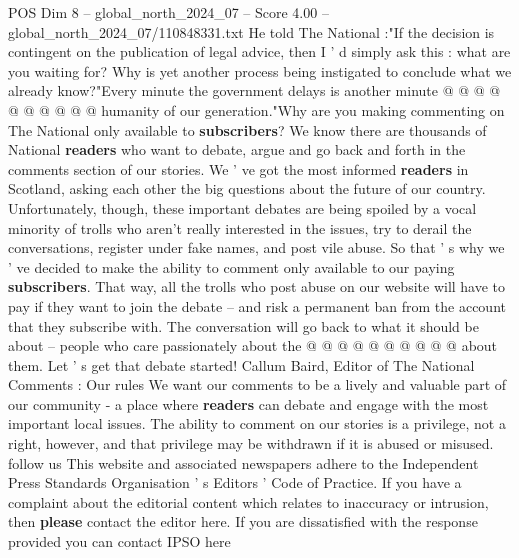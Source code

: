 \begin{textsample}{POS Dim 8 – global\_north\_2024\_07 – Score 4.00 – global\_north\_2024\_07/110848331.txt}
He told The National :"If the decision is contingent on the publication of legal advice, then I ' d simply ask this : what are you waiting for?
Why is yet another process being instigated to conclude what we already know?"Every minute the government delays is another minute @ @ @ @ @ @ @ @ @ @ humanity of our generation."Why are you making commenting on The National only available to \textbf{subscribers}?
We know there are thousands of National \textbf{readers} who want to debate, argue and go back and forth in the comments section of our stories.
We ' ve got the most informed \textbf{readers} in Scotland, asking each other the big questions about the future of our country.
Unfortunately, though, these important debates are being spoiled by a vocal minority of trolls who aren't really interested in the issues, try to derail the conversations, register under fake names, and post vile abuse.
So that ' s why we ' ve decided to make the ability to comment only available to our paying \textbf{subscribers}.
That way, all the trolls who post abuse on our website will have to pay if they want to join the debate -- and risk a permanent ban from the account that they subscribe with.
The conversation will go back to what it should be about -- people who care passionately about the @ @ @ @ @ @ @ @ @ @ about them.
Let ' s get that debate started!
Callum Baird, Editor of The National Comments : Our rules We want our comments to be a lively and valuable part of our community - a place where \textbf{readers} can debate and engage with the most important local issues.
The ability to comment on our stories is a privilege, not a right, however, and that privilege may be withdrawn if it is abused or misused. follow us This website and associated newspapers adhere to the Independent Press Standards Organisation ' s Editors ' Code of Practice.
If you have a complaint about the editorial content which relates to inaccuracy or intrusion, then \textbf{please} contact the editor here.
If you are dissatisfied with the response provided you can contact IPSO here

\end{textsample}
